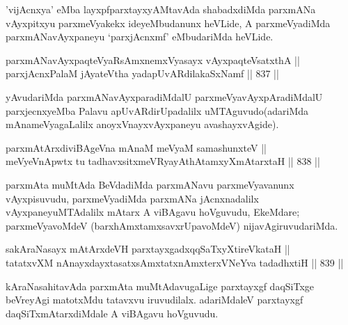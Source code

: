 \begin{artha}
'vijAcnxya' eMba layxpfparxtayxyAMtavAda shabadxdiMda parxmANa vAyxpitxyu parxmeVyakekx ideyeMbudanunx heVLide, A parxmeVyadiMda parxmANavAyxpaneyu `parxjAcnxmf' eMbudariMda heVLide.
\end{artha}


\begin{shl}
parxmANavAyxpaqteVyaRsAmxnemxVyasayx vAyxpaqteVsatxthA ||  \\
parxjAcnxPalaM jAyateV\s tha yadapUvARdilakaSxNamf \hfill || 837 ||  
\end{shl}

\begin{artha}
yAvudariMda parxmANavAyxparadiMdalU parxmeVyavAyxpAradiMdalU parxjecnxyeMba Palavu apUvARdirUpadalilx uMTAguvudo(adariMda mAnameVyagaLalilx anoyxVnayxvAyxpaneyu avashayxvAgide).
\end{artha}


\begin{shl}
parxmAtArxdiviBAgeVna mAnaM meVyaM samashunxteV || \\
meVyeVnA\s \s pwtx tu tadhavxsitxmeVRyayAthAtamxyXmAtarxtaH \hfill || 838 ||  
\end{shl}

\begin{artha}
parxmAta muMtAda BeVdadiMda parxmANavu parxmeVyavanunx vAyxpisuvudu, parxmeVyadiMda parxmANa jAcnxnadalilx vAyxpaneyuMTAdalilx mAtarx A viBAgavu hoVguvudu, EkeMdare; parxmeVyavoMdeV (barxhAmxtamxsavxrUpavoMdeV) nijavAgiruvudariMda.
\end{artha}

\begin{shl}
sakAraNasayx mAtArxdeVH parxtayxgadxqqSaTxyXtireVkataH || \\
tatatxvXM nAnayxdayxtasatxsAmxtatxnAmxterxVNeYva tadadhxtiH \hfill || 839 ||  
\end{shl}

\begin{artha}
kAraNasahitavAda parxmAta muMtAdavugaLige parxtayxgf daqSiTxge beVreyAgi matotxMdu tatavxvu iruvudilalx. adariMdaleV parxtayxgf daqSiTxmAtarxdiMdale A viBAgavu hoVguvudu.
\end{artha}


